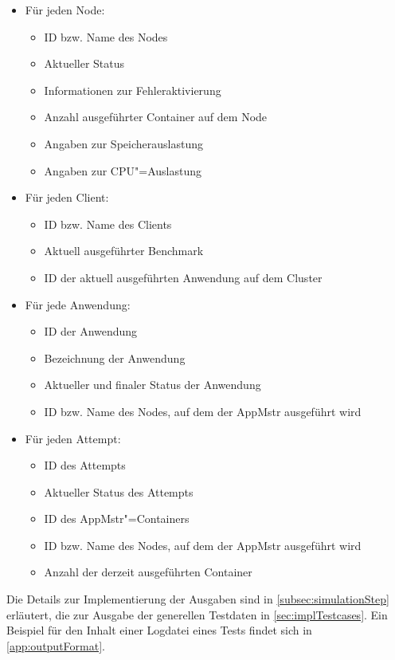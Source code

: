 \begin{itemize}
    \item Für jeden Node:
    \begin{itemize}
        \item ID bzw. Name des Nodes
        \item Aktueller Status
        \item Informationen zur Fehleraktivierung
        \item Anzahl ausgeführter Container auf dem Node
        \item Angaben zur Speicherauslastung
        \item Angaben zur CPU"=Auslastung
    \end{itemize}
    
    \item Für jeden Client:
    \begin{itemize}
        \item ID bzw. Name des Clients
        \item Aktuell ausgeführter Benchmark
        \item ID der aktuell ausgeführten Anwendung auf dem Cluster
    \end{itemize}

    \item Für jede Anwendung:
    \begin{itemize}
        \item ID der Anwendung
        \item Bezeichnung der Anwendung
        \item Aktueller und finaler Status der Anwendung
        \item ID bzw. Name des Nodes, auf dem der \gls{AppMstr} ausgeführt wird
    \end{itemize}

    \item Für jeden Attempt:
    \begin{itemize}
        \item ID des Attempts
        \item Aktueller Status des Attempts
        \item ID des \gls{AppMstr}"=Containers
        \item ID bzw. Name des Nodes, auf dem der \gls{AppMstr} ausgeführt wird
        \item Anzahl der derzeit ausgeführten Container
    \end{itemize}
\end{itemize}

Die Details zur Implementierung der Ausgaben sind in \cref{subsec:simulationStep} erläutert, die zur Ausgabe der generellen Testdaten in \cref{sec:implTestcases}. Ein Beispiel für den Inhalt einer Logdatei eines Tests findet sich in \cref{app:outputFormat}.
